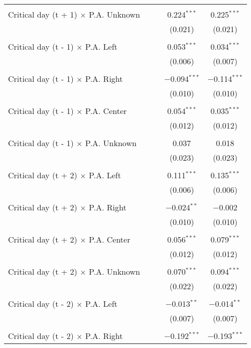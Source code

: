\documentclass[
]{article}
\begin{document}
\begin{table}[!htbp]
{\begin{tabular}{@{\extracolsep{5pt}}lcccc}
  & & & & \\ 
 Critical day (t + 1) $\times$ P.A. Unknown &  &  & 0.224$^{***}$ & 0.225$^{***}$ \\ 
  &  &  & (0.021) & (0.021) \\ 
  & & & & \\ 
 Critical day (t - 1) $\times$ P.A. Left &  &  & 0.053$^{***}$ & 0.034$^{***}$ \\ 
  &  &  & (0.006) & (0.007) \\ 
  & & & & \\ 
 Critical day (t - 1) $\times$ P.A. Right &  &  & $-$0.094$^{***}$ & $-$0.114$^{***}$ \\ 
  &  &  & (0.010) & (0.010) \\ 
  & & & & \\ 
 Critical day (t - 1) $\times$ P.A. Center &  &  & 0.054$^{***}$ & 0.035$^{***}$ \\ 
  &  &  & (0.012) & (0.012) \\ 
  & & & & \\ 
 Critical day (t - 1) $\times$ P.A. Unknown &  &  & 0.037 & 0.018 \\ 
  &  &  & (0.023) & (0.023) \\ 
  & & & & \\ 
 Critical day (t + 2) $\times$ P.A. Left &  &  & 0.111$^{***}$ & 0.135$^{***}$ \\ 
  &  &  & (0.006) & (0.006) \\ 
  & & & & \\ 
 Critical day (t + 2) $\times$ P.A. Right &  &  & $-$0.024$^{**}$ & $-$0.002 \\ 
  &  &  & (0.010) & (0.010) \\ 
  & & & & \\ 
 Critical day (t + 2) $\times$ P.A. Center &  &  & 0.056$^{***}$ & 0.079$^{***}$ \\ 
  &  &  & (0.012) & (0.012) \\ 
  & & & & \\ 
 Critical day (t + 2) $\times$ P.A. Unknown &  &  & 0.070$^{***}$ & 0.094$^{***}$ \\ 
  &  &  & (0.022) & (0.022) \\ 
  & & & & \\ 
 Critical day (t - 2) $\times$ P.A. Left &  &  & $-$0.013$^{**}$ & $-$0.014$^{**}$ \\ 
  &  &  & (0.007) & (0.007) \\ 
  & & & & \\ 
 Critical day (t - 2) $\times$ P.A. Right &  &  & $-$0.192$^{***}$ & $-$0.193$^{***}$ \\ 

\end{tabular}}
\end{table}
\end{document}
